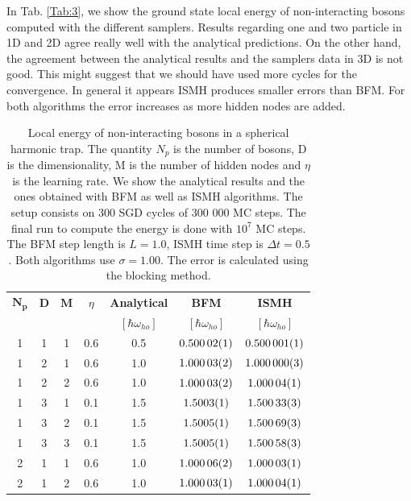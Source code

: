 In Tab. \ref{Tab:3}, we show the ground state local energy of non-interacting bosons computed with the different samplers. Results regarding one and two particle in 1D and 2D agree really well with the analytical predictions. On the other hand, the agreement between the analytical results and the samplers data in 3D is not good. This might suggest that we should have used more cycles for the convergence. In general it appears ISMH produces smaller errors than BFM. For both algorithms the error increases as more hidden nodes are added.  

\begin{table}[H]
\centering
\caption{Local energy of non-interacting bosons in a spherical harmonic trap. The quantity $N_p$ is the number of bosons, D is the dimensionality, M is the number of hidden nodes and $\eta$ is the learning rate. We show the analytical results and the ones obtained with BFM as well as ISMH algorithms. The setup consists on 300 SGD cycles of 300 000 MC steps. The final run to compute the energy is done with $10^7$ MC steps. The BFM step length is $L=1.0$, ISMH time step is $\Delta t = 0.5$. Both algorithms use $\sigma = 1.00$.  The error is calculated using the blocking method.}
\begin{tabular}{c c c c |c c c} 
$\boldsymbol{N_p}$ & \textbf{D}  & $\boldsymbol{M}$ & $\eta$ & \textbf{Analytical} & \textbf{BFM} & \textbf{ISMH} \\
&&&&$[\hbar\omega_{ho}]$ &$[\hbar\omega_{ho}]$&$[\hbar\omega_{ho}]$\\\hline
1 & 1 & 1 & 0.6 & 0.5  & $\SI{0.50002\pm 0.00001}{}  $ & $\SI{0.500001\pm 0.000001}{}$ \\ \hline
1 & 2 & 1 &0.6 & 1.0   & $\SI{1.00003\pm 0.00002}{} $ & $\SI{1.000000\pm 0.000003}{}$ \\
1 & 2 & 2 &0.6 & 1.0   & $\SI{1.00003\pm 0.00002}{} $ & $\SI{1.00004\pm 0.00001}{}$ \\ \hline
1 & 3 & 1 &0.1 & 1.5  &  $\SI{1.5003\pm 0.0001}{} $ &  $\SI{1.50033\pm 0.00003}{}$\\
1 & 3 & 2 &0.1 & 1.5   &  $\SI{1.5005\pm 0.0001}{} $ & $\SI{1.50069\pm 0.00003}{}$ \\
1 & 3 & 3 &0.1 & 1.5   &  $\SI{1.5005\pm 0.0001}{}$&   $\SI{1.50058\pm 0.00003}{}$\\ \hline
2 & 1 & 1 &0.6 & 1.0  & $\SI{1.00006\pm 0.00002}{} $ & $\SI{1.00003\pm 0.00001}{}$ \\ 
2 & 1 & 2 &0.6 & 1.0  & $\SI{1.00003\pm 0.00001}{}$ & $\SI{1.00004\pm 0.00001}{}$ \\ \hline

\end{tabular}
\end{table}
